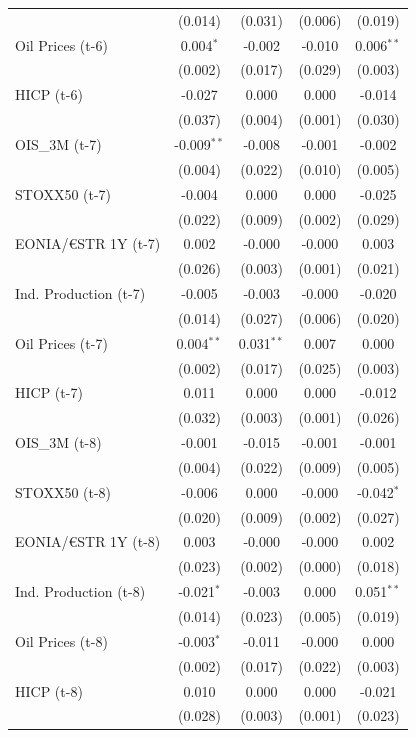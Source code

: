 \begin{longtable}[t]{lcccc}
 & (0.014) & (0.031) & (0.006) & (0.019)\\
Oil Prices (t-6) & 0.004$^{*}$ & -0.002 & -0.010 & 0.006$^{**}$\\
 & (0.002) & (0.017) & (0.029) & (0.003)\\
HICP (t-6) & -0.027 & 0.000 & 0.000 & -0.014\\
 & (0.037) & (0.004) & (0.001) & (0.030)\\
OIS\_3M (t-7) & -0.009$^{**}$ & -0.008 & -0.001 & -0.002\\
 & (0.004) & (0.022) & (0.010) & (0.005)\\
STOXX50 (t-7) & -0.004 & 0.000 & 0.000 & -0.025\\
 & (0.022) & (0.009) & (0.002) & (0.029)\\
EONIA/€STR 1Y (t-7) & 0.002 & -0.000 & -0.000 & 0.003\\
 & (0.026) & (0.003) & (0.001) & \vphantom{1} (0.021)\\
Ind. Production (t-7) & -0.005 & -0.003 & -0.000 & -0.020\\
 & (0.014) & (0.027) & (0.006) & (0.020)\\
Oil Prices (t-7) & 0.004$^{**}$ & 0.031$^{**}$ & 0.007 & 0.000\\
 & (0.002) & (0.017) & (0.025) & (0.003)\\
HICP (t-7) & 0.011 & 0.000 & 0.000 & -0.012\\
 & (0.032) & (0.003) & (0.001) & (0.026)\\
OIS\_3M (t-8) & -0.001 & -0.015 & -0.001 & -0.001\\
 & (0.004) & (0.022) & (0.009) & (0.005)\\
STOXX50 (t-8) & -0.006 & 0.000 & -0.000 & -0.042$^{*}$\\
 & (0.020) & (0.009) & (0.002) & (0.027)\\
EONIA/€STR 1Y (t-8) & 0.003 & -0.000 & -0.000 & 0.002\\
 & (0.023) & (0.002) & (0.000) & (0.018)\\
Ind. Production (t-8) & -0.021$^{*}$ & -0.003 & 0.000 & 0.051$^{**}$\\
 & (0.014) & (0.023) & (0.005) & (0.019)\\
Oil Prices (t-8) & -0.003$^{*}$ & -0.011 & -0.000 & 0.000\\
 & (0.002) & (0.017) & (0.022) & (0.003)\\
HICP (t-8) & 0.010 & 0.000 & 0.000 & -0.021\\
 & (0.028) & (0.003) & (0.001) & (0.023)\\

\end{longtable}
